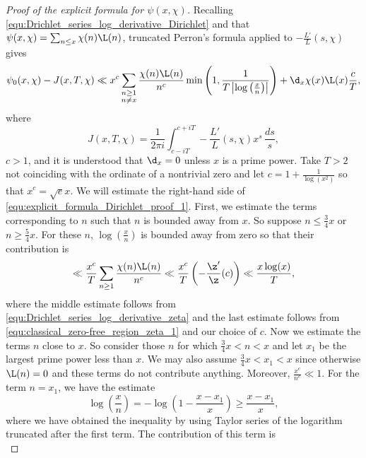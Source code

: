       \begin{proof}[Proof of the explicit formula for $\psi(x,\chi)$]
        Recalling \cref{equ:Drichlet_series_log_derivative_Dirichlet} and that $\psi(x,\chi) = \sum_{n \le x}\chi(n)\L(n)$, truncated Perron's formula applied to $-\frac{L'}{L}(s,\chi)$ gives
        \begin{equation}\label{equ:explicit_formula_Dirichlet_proof_1}
          \psi_{0}(x,\chi)-J(x,T,\chi) \ll x^{c}\sum_{\substack{n \ge 1 \\ n \neq x}}\frac{\chi(n)\L(n)}{n^{c}}\min\left(1,\frac{1}{T\left|\log\left(\frac{x}{n}\right)\right|}\right)+\d_{x}\chi(x)\L(x)\frac{c}{T},
        \end{equation}
        where
        \[
          J(x,T,\chi) = \frac{1}{2\pi i}\int_{c-iT}^{c+iT}-\frac{L'}{L}(s,\chi)x^{s}\,\frac{ds}{s},
        \]
        $c > 1$, and it is understood that $\d_{x} = 0$ unless $x$ is a prime power. Take $T > 2$ not coinciding with the ordinate of a nontrivial zero and let $c = 1+\frac{1}{\log(x^{2})}$ so that $x^{c} = \sqrt{e}x$. We will estimate the right-hand side of \cref{equ:explicit_formula_Dirichlet_proof_1}. First, we estimate the terms corresponding to $n$ such that $n$ is bounded away from $x$. So suppose $n \le \frac{3}{4}x$ or $n \ge \frac{5}{4}x$. For these $n$, $\log\left(\frac{x}{n}\right)$ is bounded away from zero so that their contribution is
        \begin{equation}\label{equ:explicit_formula_Dirichlet_proof_2}
          \ll \frac{x^{c}}{T}\sum_{n \ge 1}\frac{\chi(n)\L(n)}{n^{c}} \ll \frac{x^{c}}{T}\left(-\frac{\z'}{\z}(c)\right) \ll \frac{x\log(x)}{T},
        \end{equation}
        where the middle estimate follows from \cref{equ:Drichlet_series_log_derivative_zeta} and the last estimate follows from \cref{equ:classical_zero-free_region_zeta_1} and our choice of $c$. Now we estimate the terms $n$ close to $x$. So consider those $n$ for which $\frac{3}{4}x < n < x$ and let $x_{1}$ be the largest prime power less than $x$. We may also assume $\frac{3}{4}x < x_{1} < x$ since otherwise $\L(n) = 0$ and these terms do not contribute anything. Moreover, $\frac{x^{c}}{n^{c}} \ll 1$. For the term $n = x_{1}$, we have the estimate
        \[
          \log\left(\frac{x}{n}\right) = -\log\left(1-\frac{x-x_{1}}{x}\right) \ge \frac{x-x_{1}}{x},
        \]
        where we have obtained the inequality by using Taylor series of the logarithm truncated after the first term. The contribution of this term is
        \begin{equation}\label{equ:explicit_formula_Dirichlet_proof_3}

\end{equation}
\end{proof}
